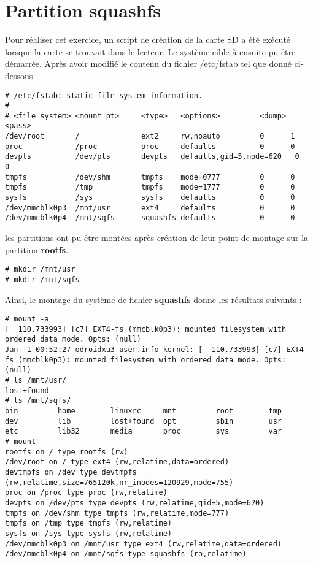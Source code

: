 \section{Partition squashfs}
Pour réaliser cet exercice, un script de création de la carte SD a été exécuté lorsque la carte \usd se trouvait dans le lecteur. Le système cible à ensuite pu être démarrée. Après avoir modifié le contenu du fichier /etc/fstab tel que donné ci-dessous
\begin{lstlisting}
# /etc/fstab: static file system information.
#
# <file system> <mount pt>     <type>   <options>         <dump> <pass>
/dev/root       /              ext2     rw,noauto         0      1
proc            /proc          proc     defaults          0      0
devpts          /dev/pts       devpts   defaults,gid=5,mode=620   0      0
tmpfs           /dev/shm       tmpfs    mode=0777         0      0
tmpfs           /tmp           tmpfs    mode=1777         0      0
sysfs           /sys           sysfs    defaults          0      0
/dev/mmcblk0p3  /mnt/usr       ext4     defaults          0      0
/dev/mmcblk0p4  /mnt/sqfs      squashfs defaults          0      0
\end{lstlisting}

les partitions ont pu être montées après création de leur point de montage sur la partition \textbf{rootfs}.
\begin{lstlisting}
# mkdir /mnt/usr
# mkdir /mnt/sqfs
\end{lstlisting}

Ainsi, le montage du système de fichier \textbf{squashfs} donne les résultats suivants :
\begin{lstlisting}[style=Bash]
# mount -a
[  110.733993] [c7] EXT4-fs (mmcblk0p3): mounted filesystem with ordered data mode. Opts: (null)
Jan  1 00:52:27 odroidxu3 user.info kernel: [  110.733993] [c7] EXT4-fs (mmcblk0p3): mounted filesystem with ordered data mode. Opts: (null)
# ls /mnt/usr/
lost+found
# ls /mnt/sqfs/
bin         home        linuxrc     mnt         root        tmp
dev         lib         lost+found  opt         sbin        usr
etc         lib32       media       proc        sys         var
# mount
rootfs on / type rootfs (rw)
/dev/root on / type ext4 (rw,relatime,data=ordered)
devtmpfs on /dev type devtmpfs (rw,relatime,size=765120k,nr_inodes=120929,mode=755)
proc on /proc type proc (rw,relatime)
devpts on /dev/pts type devpts (rw,relatime,gid=5,mode=620)
tmpfs on /dev/shm type tmpfs (rw,relatime,mode=777)
tmpfs on /tmp type tmpfs (rw,relatime)
sysfs on /sys type sysfs (rw,relatime)
/dev/mmcblk0p3 on /mnt/usr type ext4 (rw,relatime,data=ordered)
/dev/mmcblk0p4 on /mnt/sqfs type squashfs (ro,relatime)
\end{lstlisting}

